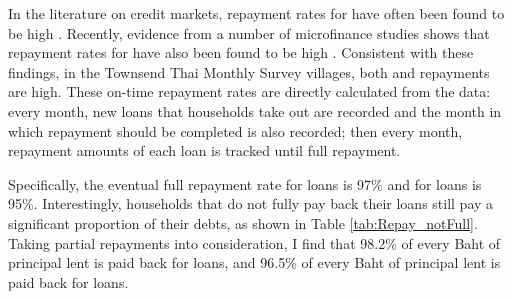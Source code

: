 \label{subsec:datatwo}

In the literature on \LLC credit markets, repayment rates for \LLC \BBBB have often been found to be high \autocite{morduch_microfinance_1999}. Recently, evidence from a number of microfinance studies shows that repayment rates for \NLC \BBBB have also been found to be high \autocite{buera_macroeconomics_2012}. Consistent with these findings, in the Townsend Thai Monthly Survey villages, both \NLC and \LLC repayments are high. These on-time repayment rates are directly calculated from the data: every month, new loans that households take out are recorded and the month in which repayment should be completed is also recorded; then every month, repayment amounts of each loan is tracked until full repayment.

Specifically, the eventual full repayment rate for \NLC loans is 97\% and for \LLC loans is 95\%. Interestingly, households that do not fully pay back their loans still pay a significant proportion of their debts, as shown in Table \ref{tab:Repay_notFull}. Taking partial repayments into consideration, I find that 98.2\% of every Baht of principal lent is paid back for \NLC loans, and 96.5\% of every Baht of principal lent is paid back for \LLC loans.
